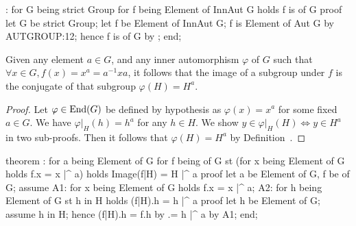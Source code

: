 \nwenddocs{}\endmoddef\nwstartdeflinemarkup{}\nwenddeflinemarkup
{}:
  for G being strict Group
  for f being Element of InnAut G
  holds f is  of G
proof
  let G be strict Group;
  let f be Element of InnAut G;
  f is Element of Aut G by AUTGROUP:12;
  hence f is  of G by ;
end;
\eatline
{}\nwendcode{}\nwdocspar
\begin{theorem}\label{thm:characteristic:inner:image-of-inner-automorphism-on-subgroup}
Given any element $a\in G$, and any inner automorphism $\varphi$ of $G$ such
that $\forall x\in G, f(x) = x^{a} = a^{-1}xa$, it follows that the
image of a subgroup under $f$ is the conjugate of that subgroup
$\varphi(H) = H^{a}$.
\end{theorem}

\begin{proof}
Let $\varphi\in\operatorname{End}(G)$ be defined by hypothesis as $\varphi(x)=x^{a}$
for some fixed $a\in G$. We have $\varphi|_{H}(h)= h^{a}$ for any $h\in H$.
We show $y\in\varphi|_{H}(H)\iff y\in H^{a}$ in two sub-proofs. Then it
follows that $\varphi(H)=H^{a}$ by Definition~.
\end{proof}

\nwenddocs{}\endmoddef\nwstartdeflinemarkup{}\nwenddeflinemarkup
theorem :
  for a being Element of G
  for f being   of G
  st (for x being Element of G holds f.x = x |^ a)
  holds Image(f|H) = H |^ a
proof
  let a be Element of G,
      f be   of G;
  assume
A1: for x being Element of G holds f.x = x |^ a;
A2: for h being Element of G st h in H holds (f|H).h = h |^ a
  proof
    let h be Element of G;
    assume h in H;
    hence (f|H).h = f.h by 
                 .= h |^ a by A1;
  end;

